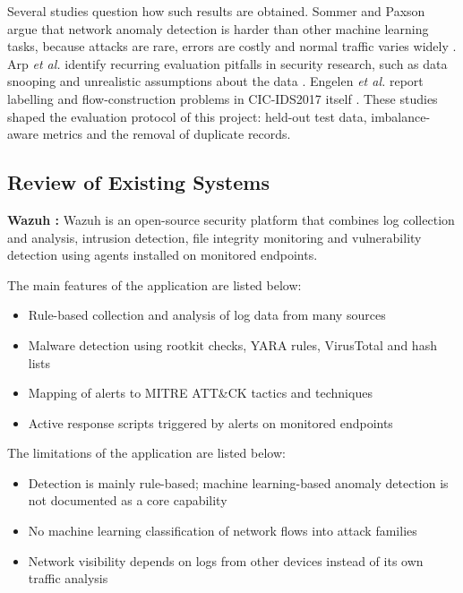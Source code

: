 Several studies question how such results are obtained. Sommer and Paxson argue that network anomaly detection is harder than other machine learning tasks, because attacks are rare, errors are costly and normal traffic varies widely \cite{sommer2010outside}. Arp \textit{et al.} identify recurring evaluation pitfalls in security research, such as data snooping and unrealistic assumptions about the data \cite{arp2022dos}. Engelen \textit{et al.} report labelling and flow-construction problems in CIC-IDS2017 itself \cite{engelen2021troubleshooting}. These studies shaped the evaluation protocol of this project: held-out test data, imbalance-aware metrics and the removal of duplicate records.

\subsection{Review of Existing Systems}

\vspace{6pt}
\textbf{Wazuh \cite{wazuhdocs}:} Wazuh is an open-source security platform that combines log collection and analysis, intrusion detection, file integrity monitoring and vulnerability detection using agents installed on monitored endpoints.

The main features of the application are listed below:
\begin{itemize}
    \setlength{\itemsep}{1pt}
    \setlength{\parskip}{0pt}
    \setlength{\parsep}{0pt}
    \item Rule-based collection and analysis of log data from many sources
    \item Malware detection using rootkit checks, YARA rules, VirusTotal and hash lists
    \item Mapping of alerts to MITRE ATT\&CK tactics and techniques
    \item Active response scripts triggered by alerts on monitored endpoints
\end{itemize}

The limitations of the application are listed below:
\begin{itemize}
    \setlength{\itemsep}{1pt}
    \setlength{\parskip}{0pt}
    \setlength{\parsep}{0pt}
    \item Detection is mainly rule-based; machine learning-based anomaly detection is not documented as a core capability
    \item No machine learning classification of network flows into attack families
    \item Network visibility depends on logs from other devices instead of its own traffic analysis
\end{itemize}

